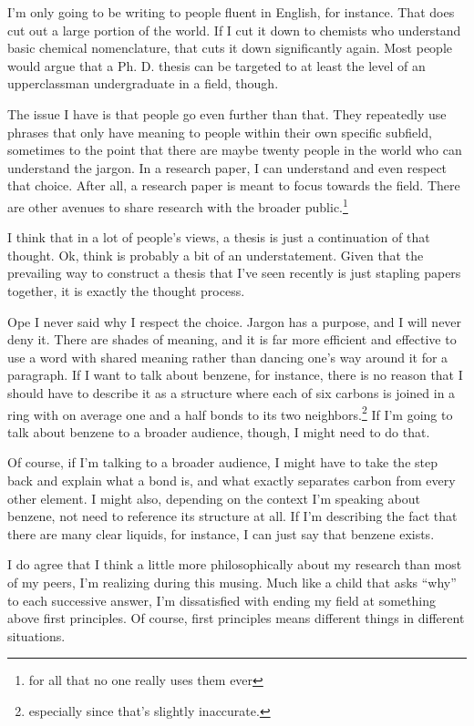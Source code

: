 \documentclass[12pt]{article}[titlepage]
\newcommand{\say}[1]{``#1''}
\newcommand{\1}{\={a}}
\newcommand{\2}{\={e}}
\newcommand{\3}{\={\i}}
\newcommand{\4}{\=o}
\newcommand{\5}{\=u}
\newcommand{\6}{\={A}}
\renewcommand{\,}{\textsuperscript{,}}
\begin{document}
I'm only going to be writing to people fluent in English, for instance.
That does cut out a large portion of the world.
If I cut it down to chemists who understand basic chemical nomenclature, that cuts it down significantly again.
Most people would argue that a Ph. D. thesis can be targeted to at least the level of an upperclassman undergraduate in a field, though.

The issue I have is that people go even further than that.
They repeatedly use phrases that only have meaning to people within their own specific subfield, sometimes to the point that there are maybe twenty people in the world who can understand the jargon.
In a research paper, I can understand and even respect that choice.
After all, a research paper is meant to focus towards the field.
There are other avenues to share research with the broader public.\footnote{for all that no one really uses them ever}

I think that in a lot of people's views, a thesis is just a continuation of that thought.
Ok, think is probably a bit of an understatement.
Given that the prevailing way to construct a thesis that I've seen recently is just stapling papers together, it is exactly the thought process.

Ope I never said why I respect the choice.
Jargon has a purpose, and I will never deny it.
There are shades of meaning, and it is far more efficient and effective to use a word with shared meaning rather than dancing one's way around it for a paragraph.
If I want to talk about benzene, for instance, there is no reason that I should have to describe it as a structure where each of six carbons is joined in a ring with on average one and a half bonds to its two neighbors.\footnote{especially since that's slightly inaccurate.}
If I'm going to talk about benzene to a broader audience, though, I might need to do that.

Of course, if I'm talking to a broader audience, I might have to take the step back and explain what a bond is, and what exactly separates carbon from every other element.
I might also, depending on the context I'm speaking about benzene, not need to reference its structure at all.
If I'm describing the fact that there are many clear liquids, for instance, I can just say that benzene exists.

I do agree that I think a little more philosophically about my research than most of my peers, I'm realizing during this musing.
Much like a child that asks \say{why} to each successive answer, I'm dissatisfied with ending my field at something above first principles.
Of course, first principles means different things in different situations.
\end{document}
